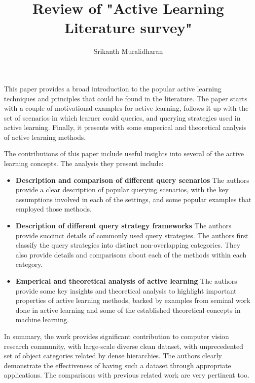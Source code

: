 \documentclass[]{article}
\title{Review of "Active Learning Literature survey"}
\author{Srikanth Muralidharan}
\begin{document}
\maketitle

This paper provides a broad introduction to the popular active learning techniques and principles that could be 
found in the literature. The paper starts with a couple of motivational examples for active learning, follows it up
with the set of scenarios in which learner could queries, and querying strategies used in active learning. Finally, it presents
with some emperical and theoretical analysis of active learning methods.
\par

The contributions of this paper include useful insights into several of the active learning concepts. The analysis
they present include:

\begin{itemize}
	\item {\bf Description and comparison of different query scenarios} The authors provide a clear description of popular
		querying scenarios, with the key assumptions involved in each of the settings, and some popular examples that employed those 
		methods.
	\item {\bf Description of different query strategy frameworks} The authors provide succinct details of commonly used query strategies.
		The authors first classify the query strategies into distinct non-overlapping categories. They also provide details and comparisons
		about each of the methods within each category.
	\item {\bf Emperical and theoretical analysis of active learning} The authors provide some key insights and theoretical analysis to highlight
		important properties of active learning methods, backed by examples from seminal work done in active learning and some of the established
		theoretical concepts in machine learning.
\end{itemize}
\par

In summary, the work provides significant contribution to computer vision research community, with large-scale diverse
clean dataset, with unprecedented set of object categories related by dense hierarchies. The authors clearly demonstrate
the effectiveness of having such a dataset through appropriate applications. The comparisons with previous related work
are very pertinent too.
\end{document}

